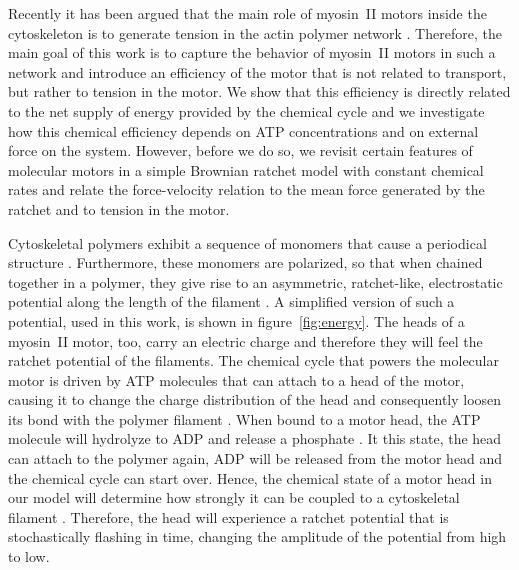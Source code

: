 \documentclass[aps,pre,twocolumn,showpacs,showkeys,superscriptaddress,floatfix]{revtex4-1}
\begin{document}
Recently it has been argued that the main role of myosin~II motors inside the cytoskeleton is to generate tension in the actin polymer network \cite{ma2012nonmuscle,chugh2017actin,monier2010actomyosin}.
Therefore, the main goal of this work is to capture the behavior of myosin~II motors in such a network 
and introduce an efficiency of the motor that is not related to transport, but rather to tension in the motor.
We show that this efficiency is directly related to the net supply of energy provided by the chemical cycle 
and we investigate how this chemical efficiency depends on ATP concentrations and on external force on the system.
However, before we do so, we revisit certain features of molecular motors in a simple Brownian ratchet model \cite{reimann2002brownian} with constant chemical rates and relate the force-velocity relation to the mean force generated by the ratchet and to tension in the motor.

Cytoskeletal polymers exhibit a sequence of monomers that cause a periodical structure \cite{yogurtcu2012mechanochemical}. 
Furthermore, these monomers are polarized, so that when chained together in a polymer, they give rise to an asymmetric, ratchet-like, electrostatic potential along the length of the filament \cite{Nie2014,nie2014conformational}. 
A simplified version of such a potential, used in this work, is shown in figure~\ref{fig:energy}. 
The heads of a myosin~II motor, too, carry an electric charge \cite{barterls1993myosin} and therefore they will feel the ratchet potential of the filaments. 
The chemical cycle that powers the molecular motor is driven by ATP molecules that can attach to a head of the motor, causing it to change the charge distribution of the head and consequently loosen its bond with the polymer filament \cite{adelstein1980regulation}. 
When bound to a motor head, the ATP molecule will hydrolyze to ADP and release a phosphate \cite{gajewski1986thermodynamics}. 
It this state, the head can attach to the polymer again, ADP will be released from the motor head and the chemical cycle can start over. 
Hence, the chemical state of a motor head in our model will determine how strongly it can be coupled to a cytoskeletal filament \cite{Nie2014,nie2014conformational}. 
Therefore, the head will experience a ratchet potential that is stochastically flashing in time, changing the amplitude of the potential from high to low.
\end{document}

